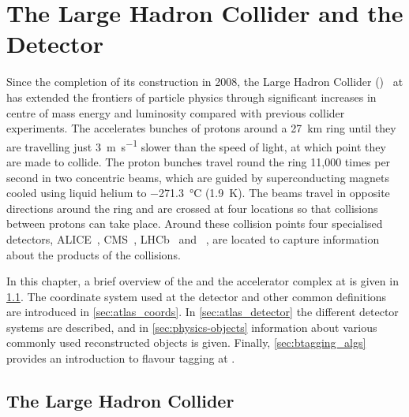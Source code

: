 \chapter{The Large Hadron Collider and the \ATLAS Detector}\label{chap:lhc_atlas}


Since the completion of its construction in 2008, the Large Hadron Collider (\LHC)~\cite{Evans:2008zzb} at \CERN has extended the frontiers of particle physics through significant increases in centre of mass energy and luminosity compared with previous collider experiments.
The \LHC accelerates bunches of protons around a \SI{27}{\km} ring until they are travelling just \SI{3}{\m\per\s} slower than the speed of light, at which point they are made to collide.
The proton bunches travel round the ring 11,000 times per second in two concentric beams, which are guided by superconducting magnets cooled using liquid helium to \SI{-271.3}{\degreeCelsius} (\SI{1.9}{\kelvin}).
The beams travel in opposite directions around the ring and are crossed at four locations so that collisions between protons can take place.
Around these collision points four specialised detectors, ALICE~\cite{AliceCollaboration_2008}, CMS~\cite{CMS-TDR-08-001}, LHCb~\cite{LHCbCollaboration_2008} and \ATLAS~\cite{PERF-2007-01}, are located to capture information about the products of the collisions.

In this chapter, a brief overview of the \LHC and the accelerator complex at \CERN is given in \cref{sec:lhc}.
The coordinate system used at the \ATLAS detector and other common definitions are introduced in \cref{sec:atlas_coords}.
In \cref{sec:atlas_detector} the different \ATLAS detector systems are described, and in \cref{sec:physics-objects} information about various commonly used reconstructed objects is given.
Finally, \cref{sec:btagging_algs} provides an introduction to flavour tagging at \ATLAS.


\section{The Large Hadron Collider}\label{sec:lhc}

